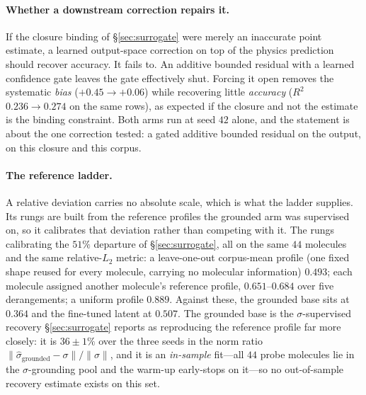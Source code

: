 \paragraph{Whether a downstream correction repairs it.}
\label{sec:gateb}
If the closure binding of \S\ref{sec:surrogate} were merely an inaccurate point estimate, a learned
output-space correction on top of the physics prediction should recover accuracy. It fails to. An
additive bounded residual with a learned confidence gate leaves the gate effectively shut. Forcing
it open removes the systematic \emph{bias} ($+0.45\to+0.06$) while recovering little
\emph{accuracy} ($R^2$ $0.236\to0.274$ on the same rows), as expected if the closure and not the
estimate is the binding constraint. Both arms run at seed $42$ alone, and the statement is about the
one correction tested: a gated additive bounded residual on the output, on this closure and this
corpus.

\paragraph{The reference ladder.} A relative deviation carries no absolute scale, which is what the
ladder supplies. Its rungs are built from the reference profiles the grounded arm was supervised on,
so it calibrates that deviation rather than competing with it. The rungs calibrating the $51\%$ departure of
\S\ref{sec:surrogate}, all on the same $44$ molecules and the same relative-$L_2$ metric: a
leave-one-out corpus-mean profile (one fixed shape reused for every molecule, carrying no molecular
information) $0.493$; each molecule assigned another molecule's reference profile, $0.651$--$0.684$
over five derangements; a uniform profile $0.889$. Against these, the grounded base sits at $0.364$
and the fine-tuned latent at $0.507$. The grounded base is the $\sigma$-supervised recovery
\S\ref{sec:surrogate} reports as reproducing the reference profile far more closely: it is
$36\pm1\%$ over the three seeds in the norm ratio
$\lVert\hat\sigma_{\mathrm{grounded}}-\sigma\rVert/\lVert\sigma\rVert$, and it is an
\emph{in-sample} fit---all $44$ probe molecules lie in the $\sigma$-grounding pool and the warm-up
early-stops on it---so no out-of-sample recovery estimate exists on this set.
